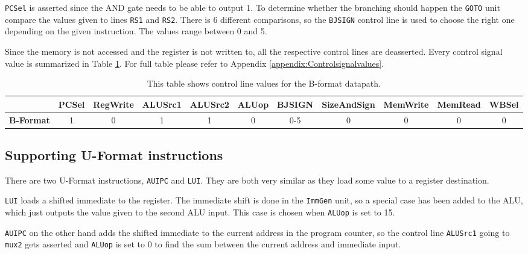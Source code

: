         \texttt{PCSel} is asserted since the AND gate needs to be able to output 1. To determine whether the branching should happen the \texttt{GOTO} unit compare the values given to lines \texttt{RS1} and \texttt{RS2}. There is 6 different comparisons, so the \texttt{BJSIGN} control line is used to choose the right one depending on the given instruction. The values range between 0 and 5.
        
        Since the memory is not accessed and the register is not written to, all the respective control lines are deasserted. Every control signal value is summarized in Table \ref{table:BFORMAT}. For full table please refer to Appendix \ref{appendix:Controlsignalvalues}.
        
        \begin{table}[h!]
            \small
            \hspace{-2.4cm}
            \begin{tabular}{|c||c|c|c|c|c|c|c|c|c|c|}
            	\hline
            	                  & \textbf{PCSel} & \textbf{RegWrite} & \textbf{ALUSrc1} & \textbf{ALUSrc2} & \textbf{ALUop} & \textbf{BJSIGN} & \textbf{SizeAndSign} & \textbf{MemWrite} & \textbf{MemRead} & \textbf{WBSel} \\ \hline\hline
            	\textbf{B-Format} &       1        &         0         &        1         &        1         &       0        &        0-5        &         0          &         0         &        0         &       0        \\ \hline
            \end{tabular}
            \caption{This table shows control line values for the B-format datapath.}
            \label{table:BFORMAT}
        \end{table}
    \subsection{Supporting U-Format instructions}
        There are two U-Format instructions, \texttt{AUIPC} and \texttt{LUI}. They are both very similar as they load some value to a register destination. 
        
        \texttt{LUI} loads a shifted immediate to the register. The immediate shift is done in the \texttt{ImmGen} unit, so a special case has been added to the ALU, which just outputs the value given to the second ALU input. This case is chosen when \texttt{ALUop} is set to 15.
        
         \texttt{AUIPC} on the other hand adds the shifted immediate to the current address in the program counter, so the control line \texttt{ALUSrc1} going to \texttt{mux2} gets asserted and \texttt{ALUop} is set to 0 to find the sum between the current address and immediate input.
         
